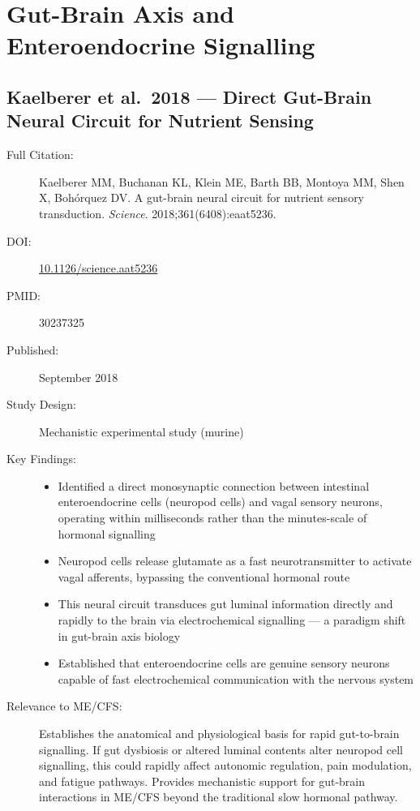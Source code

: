 \section{Gut-Brain Axis and Enteroendocrine Signalling}
\label{sec:bib-gut-brain-axis}

\subsection{Kaelberer et al.\ 2018 --- Direct Gut-Brain Neural Circuit for Nutrient Sensing}

\begin{description}
    \item[Full Citation:] Kaelberer MM, Buchanan KL, Klein ME, Barth BB, Montoya MM, Shen X, Bohórquez DV. A gut-brain neural circuit for nutrient sensory transduction. \textit{Science}. 2018;361(6408):eaat5236.
    \item[DOI:] \href{https://doi.org/10.1126/science.aat5236}{10.1126/science.aat5236}
    \item[PMID:] 30237325
    \item[Published:] September 2018
    \item[Study Design:] Mechanistic experimental study (murine)
    \item[Key Findings:]
    \begin{itemize}
        \item Identified a direct monosynaptic connection between intestinal enteroendocrine cells (neuropod cells) and vagal sensory neurons, operating within milliseconds rather than the minutes-scale of hormonal signalling
        \item Neuropod cells release glutamate as a fast neurotransmitter to activate vagal afferents, bypassing the conventional hormonal route
        \item This neural circuit transduces gut luminal information directly and rapidly to the brain via electrochemical signalling --- a paradigm shift in gut-brain axis biology
        \item Established that enteroendocrine cells are genuine sensory neurons capable of fast electrochemical communication with the nervous system
    \end{itemize}
    \item[Relevance to ME/CFS:] Establishes the anatomical and physiological basis for rapid gut-to-brain signalling. If gut dysbiosis or altered luminal contents alter neuropod cell signalling, this could rapidly affect autonomic regulation, pain modulation, and fatigue pathways. Provides mechanistic support for gut-brain interactions in ME/CFS beyond the traditional slow hormonal pathway.

\end{description}
